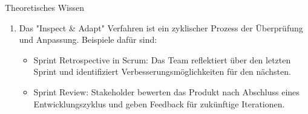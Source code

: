 \documentclass{article}
\begin{document}
\begin{exercise}{Theoretisches Wissen}
\begin{solution}
\begin{enumerate}
      \item Das "Inspect \& Adapt" Verfahren ist ein zyklischer Prozess der Überprüfung und Anpassung. Beispiele dafür sind:
            \begin{itemize}
              \item Sprint Retrospective in Scrum: Das Team reflektiert über den letzten Sprint und identifiziert Verbesserungsmöglichkeiten für den nächsten.
              \item Sprint Review: Stakeholder bewerten das Produkt nach Abschluss eines Entwicklungszyklus und geben Feedback für zukünftige Iterationen.
            \end{itemize}
    \end{enumerate}
  \end{solution}

\end{exercise}
\end{document}
